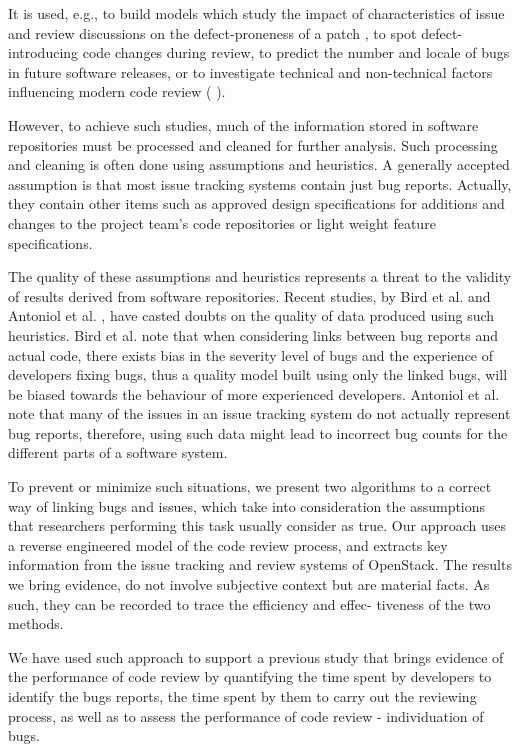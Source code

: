 \documentclass{sig-alternate-05-2015}
\begin{document}
It is used, e.g., to build models which study the impact of characteristics of issue and review discussions on the 
defect-proneness of a patch \cite{con1}, to spot defect-introducing code changes during review, to predict the number and locale 
of bugs in future software releases, or to investigate technical and non-technical 
factors influencing modern code review ( \cite{con2, con3, con4, con5, con6}).

However, to achieve such studies, 
much of the information stored in software repositories
must be processed and cleaned for further analysis. Such 
processing and cleaning is often done using assumptions 
and heuristics. A generally accepted assumption is that most issue
tracking systems contain just bug reports. Actually, 
they contain other items such as approved design specifications for 
additions and changes to the project team's code repositories or 
light weight feature specifications.

The quality of these assumptions and heuristics represents a threat to 
the validity of results derived from software 
repositories. Recent studies, by Bird et al. \cite{con7} and Antoniol et al. 
\cite{con8}, have casted doubts on the quality of data produced
using such heuristics. 
Bird et al. \cite{con7} note that when considering links between bug reports and actual 
code, there exists bias in the severity level of bugs and the experience of
developers fixing bugs, thus a quality model built using only the linked 
bugs, will be biased towards the behaviour of more experienced developers.
Antoniol et al. \cite{con8} note that many of the issues in an issue tracking system do 
not actually represent bug reports, therefore, using such data might lead to 
incorrect bug counts for the different parts of a software system.

To prevent or minimize such situations, we present two algorithms to a correct way of linking 
bugs and issues, which take into consideration the assumptions that researchers performing this task 
usually consider as true. Our approach uses a reverse engineered model of the code
review process, and extracts key information from the issue
tracking and review systems of OpenStack. The results we bring evidence,
do not involve subjective context but are material facts. As
such, they can be recorded to trace the efficiency and effec-
tiveness of the two methods.

We have used such approach to support a previous study \cite{con23} 
that brings evidence of the performance of code review by quantifying the time spent by developers to 
identify the bugs reports, the time
spent by them to carry out the reviewing process, as well as to assess the performance of code review - 
individuation of bugs.
\end{document}
